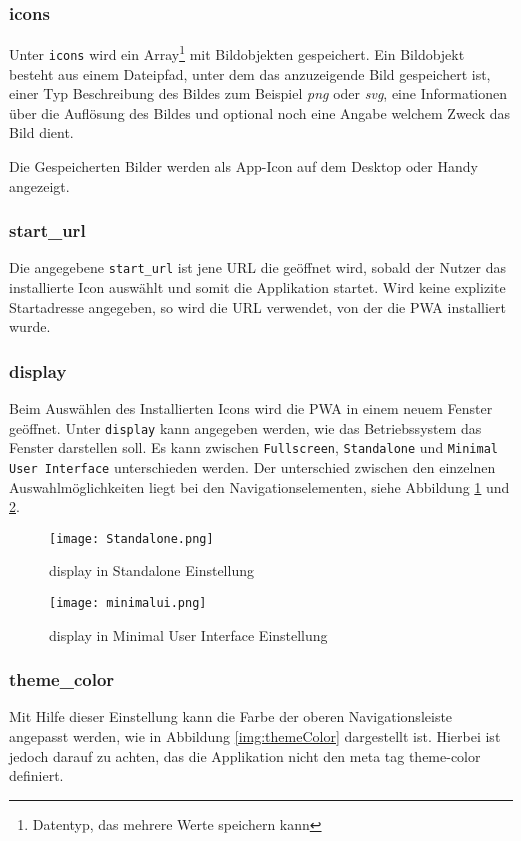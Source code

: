 \subsubsection{icons}
Unter \texttt{icons} wird ein Array\footnote{Datentyp, das mehrere Werte speichern kann} mit Bildobjekten gespeichert. Ein Bildobjekt besteht aus einem Dateipfad, unter dem das anzuzeigende Bild gespeichert ist, einer Typ Beschreibung des Bildes zum Beispiel \textit{png} oder \textit{svg}, eine Informationen über die Auflösung des Bildes und optional noch eine Angabe  welchem Zweck das Bild dient. 

Die Gespeicherten Bilder werden als App-Icon auf dem Desktop oder Handy angezeigt. 

\subsubsection{start\_url}
Die angegebene \texttt{start\_url} ist jene \ac{URL} die geöffnet wird, sobald der Nutzer das installierte Icon auswählt und somit die Applikation startet. 
Wird keine explizite Startadresse angegeben, so wird die URL verwendet, von der die PWA installiert wurde. 

\subsubsection{display}

Beim Auswählen des Installierten Icons wird die PWA in einem neuem Fenster geöffnet. Unter \texttt{display} kann angegeben werden, wie das Betriebssystem das Fenster darstellen soll. 
Es kann zwischen \texttt{Fullscreen}, \texttt{Standalone} und \texttt{Minimal User Interface} unterschieden werden. 
Der unterschied zwischen den einzelnen Auswahlmöglichkeiten liegt bei den Navigationselementen, siehe Abbildung \ref{img:Standalone} und \ref{img:minimalui}.

\begin{figure}[!htb]
    \texttt{[image: Standalone.png]}
    \caption{display in Standalone Einstellung}
    \label{img:Standalone}
\end{figure}

\begin{figure}
    \texttt{[image: minimalui.png]}
    \caption{display in Minimal User Interface Einstellung}
    \label{img:minimalui}
\end{figure}

\subsubsection{theme\_color}
Mit Hilfe dieser Einstellung kann die Farbe der oberen Navigationsleiste angepasst werden, wie in Abbildung \ref{img:themeColor} dargestellt ist. Hierbei ist jedoch darauf zu achten, das die Applikation nicht den meta tag theme-color definiert. 

